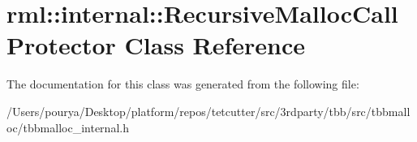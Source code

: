\hypertarget{classrml_1_1internal_1_1RecursiveMallocCallProtector}{}\section{rml\+:\+:internal\+:\+:Recursive\+Malloc\+Call\+Protector Class Reference}
\label{classrml_1_1internal_1_1RecursiveMallocCallProtector}


The documentation for this class was generated from the following file\+:\begin{DoxyCompactItemize}
\item 
/\+Users/pourya/\+Desktop/platform/repos/tetcutter/src/3rdparty/tbb/src/tbbmalloc/tbbmalloc\+\_\+internal.\+h\end{DoxyCompactItemize}
